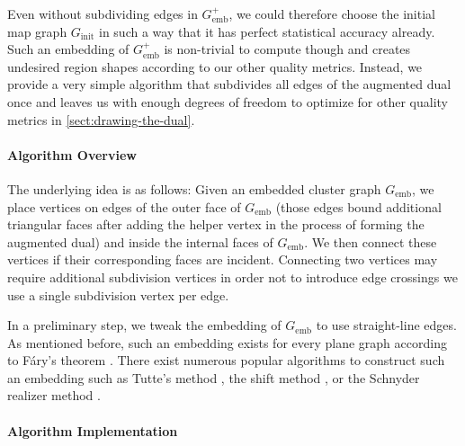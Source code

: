 Even without subdividing edges in $G_\text{emb}^+$, we could therefore choose the initial map graph $G_\text{init}$ in such a way that it has perfect statistical accuracy already.
Such an embedding of $G_\text{emb}^+$ is non-trivial to compute though and creates undesired region shapes according to our other quality metrics.
Instead, we provide a very simple algorithm that subdivides all edges of the augmented dual once and leaves us with enough degrees of freedom to optimize for other quality metrics in \cref{sect:drawing-the-dual}.



\paragraph{Algorithm Overview}

The underlying idea is as follows:
Given an embedded cluster graph $G_\text{emb}$, we place vertices on edges of the outer face of $G_\text{emb}$ (those edges bound additional triangular faces after adding the helper vertex in the process of forming the augmented dual) and inside the internal faces of $G_\text{emb}$.
We then connect these vertices if their corresponding faces are incident.
Connecting two vertices may require additional subdivision vertices in order not to introduce edge crossings \emdash{} we use a single subdivision vertex per edge.

In a preliminary step, we tweak the embedding of $G_\text{emb}$ to use straight-line edges.
As mentioned before, such an embedding exists for every plane graph according to Fáry's theorem \cite{fary1948straight}.
There exist numerous popular algorithms to construct such an embedding such as Tutte's method \cite{tutte1963draw}, the shift method \cite{fraysseix1990draw}, or the Schnyder realizer method \cite{schnyder1990embedding}.



\clearpage
\paragraph{Algorithm Implementation}

